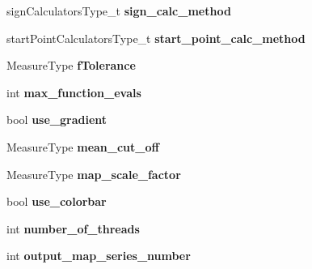 \begin{DoxyCompactItemize}
\item 
\hypertarget{struct_ox_1_1_tomato_options_a2cf923d6d04fb8cb510db2623e93119d}{sign\-Calculators\-Type\-\_\-t {\bfseries sign\-\_\-calc\-\_\-method}}\label{struct_ox_1_1_tomato_options_a2cf923d6d04fb8cb510db2623e93119d}

\item 
\hypertarget{struct_ox_1_1_tomato_options_a9da2993961d10c848b0860284900c869}{start\-Point\-Calculators\-Type\-\_\-t {\bfseries start\-\_\-point\-\_\-calc\-\_\-method}}\label{struct_ox_1_1_tomato_options_a9da2993961d10c848b0860284900c869}

\item 
\hypertarget{struct_ox_1_1_tomato_options_ae2ac4c46e46b4d183c6944771701040b}{Measure\-Type {\bfseries f\-Tolerance}}\label{struct_ox_1_1_tomato_options_ae2ac4c46e46b4d183c6944771701040b}

\item 
\hypertarget{struct_ox_1_1_tomato_options_a9b864c01b6b0b4e4d5a56470f6c5f004}{int {\bfseries max\-\_\-function\-\_\-evals}}\label{struct_ox_1_1_tomato_options_a9b864c01b6b0b4e4d5a56470f6c5f004}

\item 
\hypertarget{struct_ox_1_1_tomato_options_a367c540e5413f8ffa3a6bc6ef5781b45}{bool {\bfseries use\-\_\-gradient}}\label{struct_ox_1_1_tomato_options_a367c540e5413f8ffa3a6bc6ef5781b45}

\item 
\hypertarget{struct_ox_1_1_tomato_options_af81d1a55409036109d253b313d59e972}{Measure\-Type {\bfseries mean\-\_\-cut\-\_\-off}}\label{struct_ox_1_1_tomato_options_af81d1a55409036109d253b313d59e972}

\item 
\hypertarget{struct_ox_1_1_tomato_options_ab245e10cf32b36c48d66208a5f505099}{Measure\-Type {\bfseries map\-\_\-scale\-\_\-factor}}\label{struct_ox_1_1_tomato_options_ab245e10cf32b36c48d66208a5f505099}

\item 
\hypertarget{struct_ox_1_1_tomato_options_aa762826a11ff767aa969bd66c29b577f}{bool {\bfseries use\-\_\-colorbar}}\label{struct_ox_1_1_tomato_options_aa762826a11ff767aa969bd66c29b577f}

\item 
\hypertarget{struct_ox_1_1_tomato_options_a54efb4945f2857ee4ed9e1d5552fc3dd}{int {\bfseries number\-\_\-of\-\_\-threads}}\label{struct_ox_1_1_tomato_options_a54efb4945f2857ee4ed9e1d5552fc3dd}

\item 
\hypertarget{struct_ox_1_1_tomato_options_ab20a779c5a8dd371ec9356e3f9ce79c9}{int {\bfseries output\-\_\-map\-\_\-series\-\_\-number}}\label{struct_ox_1_1_tomato_options_ab20a779c5a8dd371ec9356e3f9ce79c9}


\end{DoxyCompactItemize}

